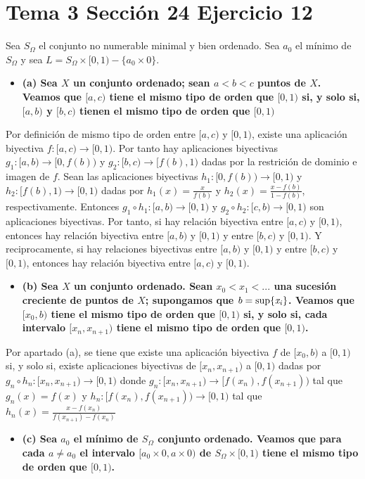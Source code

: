 \documentclass{article}
\begin{document}
\section{Tema 3 Sección 24 Ejercicio 12}
Sea $S_\Omega$ el conjunto no numerable minimal y bien ordenado. Sea $a_0$ el mínimo de $S_\Omega$ y sea $L = S_\Omega \times [0,1)-\{a_0\times 0\}$.
\begin{itemize}
\item \bf (a) \rm Sea $X$ un conjunto ordenado; sean $a<b<c$ puntos de $X$. Veamos que $[a,c)$ tiene el mismo tipo de orden que $[0,1)$ si, y solo si, $[a,b)$ y $[b,c)$ tienen el mismo tipo de orden que $[0,1)$
\end{itemize}
Por definición de mismo tipo de orden entre $[a,c)$ y $[0,1)$, existe una aplicación biyectiva $f:[a,c)\rightarrow [0,1)$. Por tanto hay aplicaciones biyectivas $g_1:[a,b)\rightarrow [0,f(b))$ y $g_2:[b,c)\rightarrow [f(b),1)$ dadas por la restrición de dominio e imagen de $f$. Sean las aplicaciones biyectivas $h_1:[0,f(b))\rightarrow [0,1)$ y  $h_2:[f(b),1)\rightarrow [0,1)$ dadas por $h_1(x)=\frac{x}{f(b)}$ y $h_2(x)=\frac{x-f(b)}{1-f(b)}$, respectivamente. Entonces $g_1\circ h_1: [a,b)\rightarrow [0,1)$ y $g_2\circ h_2: [c,b)\rightarrow [0,1)$ son aplicaciones biyectivas. Por tanto, si hay relación biyectiva entre $ [a,c)$ y $[0,1)$, entonces hay relación biyectiva entre $[a,b)$ y $[0,1)$ y entre $[b,c)$ y $[0,1)$. Y reciprocamente, si hay relaciones biyectivas entre $[a,b)$ y $[0,1)$ y entre $[b,c)$ y $[0,1)$, entonces hay relación biyectiva entre $ [a,c)$ y $[0,1)$.
\begin{itemize}
\item \bf (b) \rm Sea $X$ un conjunto ordenado. Sean $x_0<x_1<...$ una sucesión creciente de puntos de $X$; supongamos que $b=\rm sup \it \{x_i\}$. Veamos que $[x_0,b)$ tiene el mismo tipo de orden que $[0,1)$ si, y solo si, cada intervalo $[x_n,x_{n+1})$ tiene el mismo tipo de orden que $[0,1)$. 
\end{itemize}
Por apartado (a), se tiene que existe una aplicación biyectiva $f$ de $[x_0,b)$ a $[0,1)$ si, y solo si, existe aplicaciones biyectivas de $[x_n,x_{n+1})$ a $[0,1)$ dadas por $g_n\circ h_n: [x_n,x_{n+1})\rightarrow [0,1)$ donde $g_n:[x_n,x_{n+1})\rightarrow [f(x_n),f(x_{n+1}))$ tal que $g_n(x)=f(x)$ y $h_n:[f(x_n),f(x_{n+1}))\rightarrow [0,1)$ tal que $h_n(x)=\frac{x-f(x_n)}{f(x_{n+1})-f(x_n)}$
\begin{itemize}
\item \bf (c) \rm Sea $a_0$ el mínimo de $S_\Omega$ conjunto ordenado. Veamos que para cada $a\neq a_0$ el intervalo $[a_0\times 0,a\times 0)$ de $S_\Omega \times [0,1)$ tiene el mismo tipo de orden que $[0,1)$.
\end{itemize}
\end{document}
